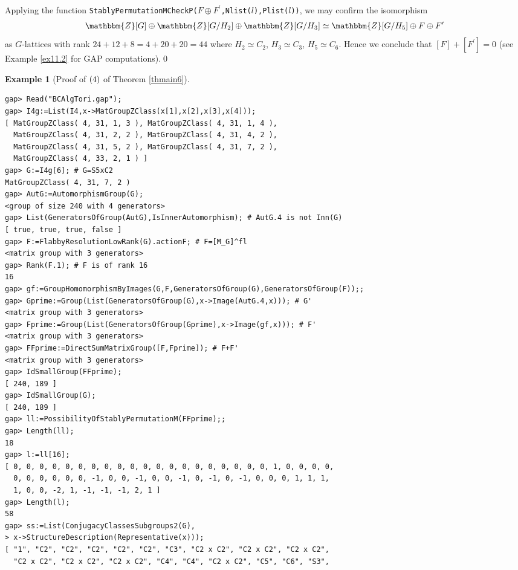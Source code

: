 \documentclass{amsart}
\theoremstyle{plain}
\theoremstyle{definition}
\newtheorem{example}[theorem]{Example}
\theoremstyle{remark}
\newcommand{\bZ}{\mathbbm{Z}}\newcommand{\bQ}{\mathbbm{Q}}
\begin{document}
{Applying the function 
{\tt StablyPermutationMCheckP(}$F\oplus F^\prime${\tt ,Nlist(}$l${\tt ),Plist(}$l${\tt ))}, 
we may confirm the isomorphism 
\begin{align*}
\bZ[G]\oplus\bZ[G/H_2]\oplus\bZ[G/H_3]
\simeq 
\bZ[G/H_5]\oplus F\oplus F^\prime
\end{align*}
as $G$-lattices 
with rank $24+12+8=4+20+20=44$ 
where 
$H_2\simeq C_2$, 
$H_3\simeq C_3$, 
$H_5\simeq C_6$. 
Hence we conclude that $[F]+[F^\prime]=0$ 
(see Example \ref{ex11.2} for GAP computations).\qed

\bigskip
\begin{example}[{Proof of ${\rm (4)}$ of {Theorem \ref{thmain6}}}]\label{ex11.1}~\vspace*{-5mm}\\
\begin{verbatim}
gap> Read("BCAlgTori.gap");
gap> I4g:=List(I4,x->MatGroupZClass(x[1],x[2],x[3],x[4]));
[ MatGroupZClass( 4, 31, 1, 3 ), MatGroupZClass( 4, 31, 1, 4 ), 
  MatGroupZClass( 4, 31, 2, 2 ), MatGroupZClass( 4, 31, 4, 2 ), 
  MatGroupZClass( 4, 31, 5, 2 ), MatGroupZClass( 4, 31, 7, 2 ), 
  MatGroupZClass( 4, 33, 2, 1 ) ]
gap> G:=I4g[6]; # G=S5xC2
MatGroupZClass( 4, 31, 7, 2 )
gap> AutG:=AutomorphismGroup(G);
<group of size 240 with 4 generators>
gap> List(GeneratorsOfGroup(AutG),IsInnerAutomorphism); # AutG.4 is not Inn(G)
[ true, true, true, false ]
gap> F:=FlabbyResolutionLowRank(G).actionF; # F=[M_G]^fl
<matrix group with 3 generators>
gap> Rank(F.1); # F is of rank 16
16
gap> gf:=GroupHomomorphismByImages(G,F,GeneratorsOfGroup(G),GeneratorsOfGroup(F));;
gap> Gprime:=Group(List(GeneratorsOfGroup(G),x->Image(AutG.4,x))); # G'
<matrix group with 3 generators>
gap> Fprime:=Group(List(GeneratorsOfGroup(Gprime),x->Image(gf,x))); # F'
<matrix group with 3 generators>
gap> FFprime:=DirectSumMatrixGroup([F,Fprime]); # F+F'
<matrix group with 3 generators>
gap> IdSmallGroup(FFprime); 
[ 240, 189 ]
gap> IdSmallGroup(G); 
[ 240, 189 ]
gap> ll:=PossibilityOfStablyPermutationM(FFprime);;
gap> Length(ll);
18
gap> l:=ll[16];
[ 0, 0, 0, 0, 0, 0, 0, 0, 0, 0, 0, 0, 0, 0, 0, 0, 0, 0, 0, 0, 1, 0, 0, 0, 0, 
  0, 0, 0, 0, 0, 0, -1, 0, 0, -1, 0, 0, -1, 0, -1, 0, -1, 0, 0, 0, 1, 1, 1, 
  1, 0, 0, -2, 1, -1, -1, -1, 2, 1 ]
gap> Length(l);
58
gap> ss:=List(ConjugacyClassesSubgroups2(G),
> x->StructureDescription(Representative(x)));
[ "1", "C2", "C2", "C2", "C2", "C2", "C3", "C2 x C2", "C2 x C2", "C2 x C2", 
  "C2 x C2", "C2 x C2", "C2 x C2", "C4", "C4", "C2 x C2", "C5", "C6", "S3", 

\end{verbatim}
\end{example}}
\end{document}
